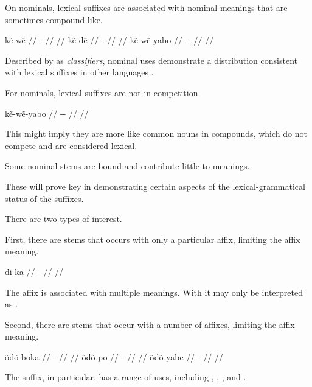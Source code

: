 \documentclass{beamer}
\begin{document}
\begin{frame}{On nominals, lexical suffixes are associated with nominal meanings that are sometimes compound-like.}
  
  \pex
  \a\begingl
  \gla kẽ-wẽ //
  \glb {}- //
  \glft {} //
  \endgl
  \a\begingl
  \gla kẽ-dẽ //
  \glb {}- //
  \glft {} //
  \endgl
  \a\begingl
  \gla kẽ-wẽ-yabo //
  \glb {}-- //
  \glft {} //
  \endgl
  \xe

  Described by \citet{Peeke1968} as \emph{classifiers}, nominal uses demonstrate a distribution consistent with lexical suffixes in other languages \citep{Haeberlin1974}.

\end{frame}

\begin{frame}{For nominals, lexical suffixes are not in competition.}

  \ex
  \begingl
  \gla kẽ-wẽ-yabo //
  \glb {}-- //
  \glft {} //
  \endgl
  \xe

  This might imply they are more like common nouns in compounds, which do not compete and are considered lexical.
\end{frame}

\begin{frame}{Some nominal stems are bound and contribute little to meanings.}

  These will prove key in demonstrating certain aspects of the lexical-grammatical status of the suffixes.

  \vfill
  
  There are two types of interest.
  
\end{frame}

\begin{frame}{First, there are stems that occurs with only a particular affix, limiting the affix meaning.}

  \ex
  \begingl
  \gla di-ka //
  \glb {}- //
  \glft {} //
  \endgl
  \xe

  The  affix is associated with multiple meanings.
  With  it may only be interpreted as .
  
\end{frame}

\begin{frame}{Second, there are stems that occur with a number of affixes, limiting the affix meaning.}

  \pex
  \a\begingl
  \gla õdõ-boka //
  \glb {}- //
  \glft {} //
  \endgl
  \a\begingl
  \gla õdõ-po //
  \glb {}- //
  \glft {} //
  \endgl
  \a\begingl
  \gla õdõ-yabe //
  \glb {}- //
  \glft {} //
  \endgl
  \xe

  The  suffix, in particular, has a range of uses, including , , , and .
\end{frame}
\end{document}
